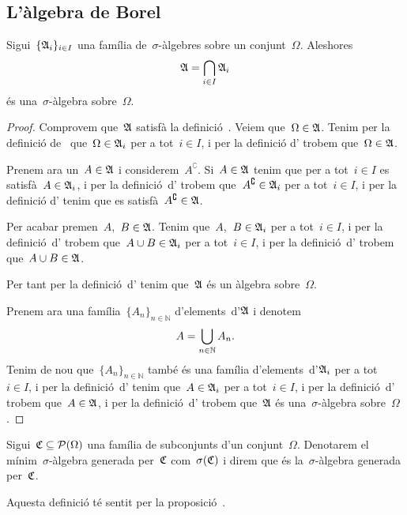 \documentclass[../Apunts.tex]{subfiles}
\begin{document}
\subsection{L'àlgebra de Borel}
	\begin{proposition}
		\label{prop:existeix una sigma àlgebra mínima}
		Sigui~\(\{\mathfrak{A}_{i}\}_{i\in I}\) una família de~\(\sigma\)-àlgebres sobre un conjunt~\(\Omega\). Aleshores
		\[\mathfrak{A}=\bigcap_{i\in I}\mathfrak{A}_{i}\]
		és una~\(\sigma\)-àlgebra sobre~\(\Omega\).
		\begin{proof}
			Comprovem que~\(\mathfrak{A}\) satisfà la definició~. Veiem que~\(\Omega\in\mathfrak{A}\). Tenim per la definició de~ que~\(\Omega\in\mathfrak{A}_{i}\) per a tot~\(i\in I\), i per la definició d' trobem que~\(\Omega\in\mathfrak{A}\).
			
			Prenem ara un~\(A\in\mathfrak{A}\) i considerem~\(A^{\complement}\). Si~\(A\in\mathfrak{A}\) tenim que per a tot~\(i\in I\) es satisfà~\(A\in\mathfrak{A}_{i}\), i per la definició~d' trobem que~\(A^{\complement}\in\mathfrak{A}_{i}\) per a tot~\(i\in I\), i per la definició d' tenim que es satisfà~\(A^{\complement}\in\mathfrak{A}\).
			
			Per acabar premen~\(A\),~\(B\in\mathfrak{A}\). Tenim que~\(A\),~\(B\in\mathfrak{A}_{i}\) per a tot~\(i\in I\), i per la definició~d' trobem que~\(A\cup B\in\mathfrak{A}_{i}\) per a tot~\(i\in I\), i per la definició~d' trobem que~\(A\cup B\in\mathfrak{A}\).
			
			Per tant per la definició~d' tenim que~\(\mathfrak{A}\) és un àlgebra sobre~\(\Omega\).
			
			Prenem ara una família~\(\{A_{n}\}_{n\in\mathbb{N}}\) d'elements~d'\(\mathfrak{A}\) i denotem
			\[A=\bigcup_{n\in\mathbb{N}}A_{n}.\]
			Tenim de nou que~\(\{A_{n}\}_{n\in\mathbb{N}}\) també és una família d'elements~d'\(\mathfrak{A}_{i}\) per a tot~\(i\in I\), i per la definició~d' tenim que~\(A\in\mathfrak{A}_{i}\) per a tot~\(i\in I\), i per la definició~d' trobem que~\(A\in\mathfrak{A}\), i per la definició~d' trobem que~\(\mathfrak{A}\) és una~\(\sigma\)-àlgebra sobre~\(\Omega\).
		\end{proof}
	\end{proposition}
	\begin{definition}
		\label{def:sigma àlgebra generada per un conjunt}
		Sigui~\(\mathfrak{C}\subseteq\operatorname{\mathcal{P}}(\Omega)\) una família de subconjunts d'un conjunt~\(\Omega\). Denotarem el mínim~\(\sigma\)-àlgebra generada per~\(\mathfrak{C}\) com~\(\sigma(\mathfrak{C})\) i direm que és la~\(\sigma\)-àlgebra generada per~\(\mathfrak{C}\).
		
		Aquesta definició té sentit per la proposició~.
	\end{definition}
\end{document}
